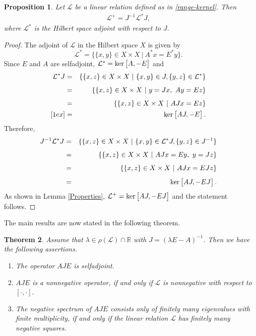 \documentclass{birkjour}
\newtheorem{thm}{Theorem}[section]
\newtheorem{prop}[thm]{Proposition}
\theoremstyle{definition}
\theoremstyle{remark}
\numberwithin{equation}{section}
\newcommand{\Ll}{\mathcal L}
\begin{document}
\begin{prop}   Let $\mathcal{L}$  be a linear relation defined as in \eqref{range-kernel}. Then
 \begin{align*}
\mathcal{L}^{+}=J^{-1}\mathcal{L}^{*}J, \end{align*} where $\Ll^*$ is the Hilbert space adjoint with respect to $J$.\end{prop} 

\begin{proof} 
The adjoint of $\Ll$ in the Hilbert space $X$ is given by 
$$
\Ll^*=\{\{x,y\}\in X\times X~|~ A^*x=E^*y\}.
$$
Since $E$ and $A$ are selfadjoint, $\mathcal{L}^{*}= \textup{ker}\begin{bmatrix}
	A,- E
\end{bmatrix}$ and
    \begin{eqnarray*}
    \mathcal{L}^{*} J&=& \{\{x,z\} \in X \times X~|~  \{x,y\}\in J, \{y,z\} \in \mathcal{L}^{*}\} \\[1ex]
    &=& \{\{x,z\} \in X \times X ~|~ y=Jx,~ Ay=Ez\}\\[1ex]
    &=& \{\{x,z\} \in X \times X  ~|~  AJx=Ez \} \\ [1ex]
    &=&  \textup{ker} \begin{bmatrix}
			AJ,- E
			\end{bmatrix}.
 \end{eqnarray*} 
Therefore,
 \begin{eqnarray*}
 J^{-1}\mathcal{L}^{*} J&=& \{\{x,z\} \in X \times X ~|~  \{x,y\}\in \mathcal{L}^{*} J, \{y,z\} \in J^{-1}\} \\[1ex]
 &=& \{\{x,z\} \in X \times X ~|~ AJx=Ey ,~ y=Jz \} \\[1ex] 
 &=& \{\{x,z\} \in X \times X~|~  AJx=EJz\} \\[1ex]
 &=&  \textup{ker} 
 \begin{bmatrix}
			AJ, -EJ
			\end{bmatrix}. 
 \end{eqnarray*} As shown in Lemma \ref{Properties}, $\mathcal{L}^{+}=\textup{ker}\begin{bmatrix}
			AJ,- EJ
			\end{bmatrix}$  and the statement follows.
\end{proof}

The main results are now stated in the following theorem.
\begin{thm}\label{Linear relation properties}
Assume that $\lambda \in \rho(\mathcal{L}) \cap \mathbb R$  with $J= (\lambda E-A)^{-1}$. Then we have the following assertions.
\begin{enumerate}
\item The operator $AJE$ is selfadjoint.
    \item 
$AJE$ is a nonnegative operator, if and only if  $\mathcal{L}$ is nonnegative with respect to $[\cdot, \cdot]$. 
\item
The negative spectrum of $AJE$ consists only of finitely many eigenvalues with finite multiplicity, if and only if  the linear relation $\mathcal{L}$ has finitely many negative squares.
\end{enumerate} \end{thm}
\end{document}

